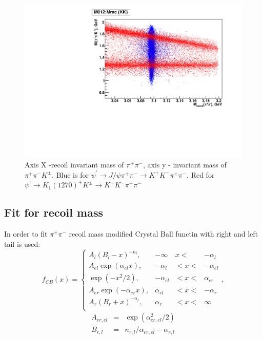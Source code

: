 \documentclass[a4paper,12pt]{article}
\begin{document}
\begin{figure}
	\includegraphics[width=\textwidth]{fig/M012_Mrec-color.pdf}
	\caption{Axis X -recoil invariant mass of $\pi^+\pi^-$,  axis y - invariant
	mass of $\pi^+\pi^-K^\pm$.  Blue is for $\psi^\prime \to J/\psi \pi^+\pi^-
	\to K^+K^-\pi^+\pi^-$. Red for $\psi^\prime \to K_1(1270)^\mp K^\pm  \to
	K^+K^-\pi^+\pi^-$}
\end{figure}


\subsection{Fit for recoil mass}

In order to fit $\pi^+\pi^-$ recoil mass modified Crystal Ball \cite{CrystalBallFunc}functin with right and left tail is used:
\begin{equation}
	f_{CB}(x)  = 	\left\{
		\begin{array}{lrrr}
			A_l(B_l - x)^{-n_l},  & -\infty &   x <&   -\alpha_l \\
			A_{el}\exp(\alpha_{el}x), &  -\alpha_l & < x  < &-\alpha_{el} \\
			\exp( - x^2/2),  &  - \alpha_{el} & < x < & \alpha_{er} \\
			A_{er}\exp(-\alpha_{er}x), &  \alpha_{el} & < x < & -\alpha_{r} \\
			A_r(B_r + x)^{-n_r}, &   \alpha_r & < x < & \infty \\
		\end{array}
		\right., 
\end{equation}
\begin{equation}
	\begin{array}{lcl}
		A_{er, el} & = &  \exp(\alpha_{er, el}^2/2) \\
		B_{ r, l}  &  = & n_{r, l}/ \alpha_{er, el} - \alpha_{r, l}
	\end{array}
\end{equation}
\end{document}
